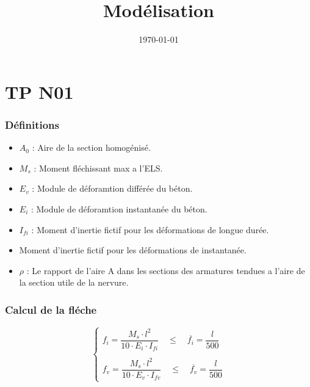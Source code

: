 \documentclass[12pt,a4paper]{article}
\title{Modélisation}
\author{}
\date{\today}
\begin{document}
	
	
	\tableofcontents
	
	\newpage
	
	\part{TP N01}
	
	\section{Définitions}
	
	\begin{itemize}
		\item $A_{0}$ : Aire de la section homogénisé.
		\item $M_{s}$ : Moment fléchissant max a l'ELS.
		\item $E_{v}$ : Module de déforamtion différée du béton.
		\item $E_{i}$ : Module de déforamtion instantanée du béton.
		\item $I_{fi}$ : Moment d'inertie fictif pour les déformations de longue durée.
		\item Moment d'inertie fictif pour les déformations de instantanée.
		\item $\rho$ : Le rapport de l'aire A dans les sections des armatures tendues a l'aire de la section utile de la nervure.
	\end{itemize}
	
	\section{Calcul de la fléche}
	
	\[ \begin{cases}
		f_{i} = \dfrac{M_{s} \cdot l^{2}}{10 \cdot E_{i} \cdot I_{fi}} \quad\leq\quad \overline{f_{i}}=\dfrac{l}{500} \\\\
		f_{v} = \dfrac{M_{s} \cdot l^{2}}{10 \cdot E_{v} \cdot I_{fv}} \quad\leq\quad \overline{f_{v}}=\dfrac{l}{500}
	\end{cases} \]
	
\end{document}
